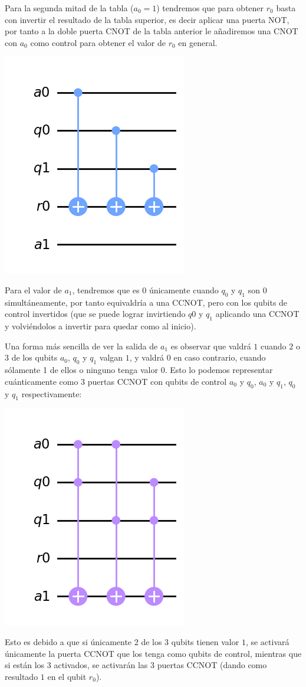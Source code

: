 Para la segunda mitad de la tabla ($a_0=1$) tendremos que para obtener $r_0$ basta con invertir el resultado de la tabla superior, es decir aplicar una puerta NOT, por tanto a la doble puerta CNOT de la tabla anterior le añadiremos una CNOT con $a_0$ como control para obtener el valor de $r_0$ en general.

\begin{center}
    \includegraphics[width=0.2\linewidth]{Imagenes/3CNOTS_q0r0_q1r0_a0r0.png}
    \label{fig:3CNOTS_q0r0_q1r0_a0r0}
\end{center}




Para el valor de $a_1$, tendremos que es $0$ únicamente cuando $q_0$ y $q_1$ son $0$ simultáneamente, por tanto equivaldría a una CCNOT, pero con los qubits de control invertidos (que se puede lograr invirtiendo $q0$ y $q_1$ aplicando una CCNOT y volviéndolos a invertir para quedar como al inicio).

Una forma más sencilla de ver la salida de $a_1$ es observar que valdrá $1$ cuando $2$ o $3$ de los qubits $a_0$, $q_0$ y $q_1$ valgan $1$, y valdrá $0$ en caso contrario, cuando sólamente 1 de ellos o ninguno tenga valor $0$.
Esto lo podemos representar cuánticamente como 3 puertas CCNOT con qubits de control $a_0$ y $q_0$, $a_0$ y $q_1$, $q_0$ y $q_1$ respectivamente:

\begin{center}
    \includegraphics[width=0.2\linewidth]{Imagenes/3CCNOTS_a0q0a1_a0q1a1_q0q1a1.png}
    \label{fig:3CCNOTS_a0q0a1_a0q1a1_q0q1a1}
\end{center}




Esto es debido a que si únicamente 2 de los 3 qubits tienen valor $1$, se activará únicamente la puerta CCNOT que los tenga como qubits de control, mientras que si están los $3$ activados, se activarán las 3 puertas CCNOT (dando como resultado $1$ en el qubit $r_0$).


